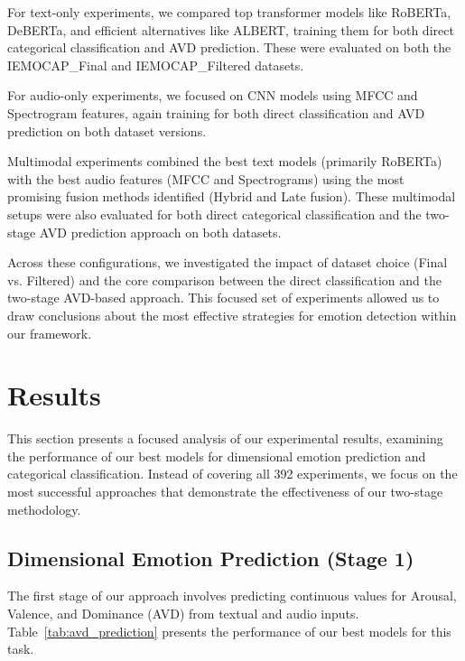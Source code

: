 \documentclass[12pt]{article}
\begin{document}
For text-only experiments, we compared top transformer models like RoBERTa, DeBERTa, and efficient alternatives like ALBERT, training them for both direct categorical classification and AVD prediction. These were evaluated on both the IEMOCAP\_Final and IEMOCAP\_Filtered datasets.

For audio-only experiments, we focused on CNN models using MFCC and Spectrogram features, again training for both direct classification and AVD prediction on both dataset versions.

Multimodal experiments combined the best text models (primarily RoBERTa) with the best audio features (MFCC and Spectrograms) using the most promising fusion methods identified (Hybrid and Late fusion). These multimodal setups were also evaluated for both direct categorical classification and the two-stage AVD prediction approach on both datasets.

Across these configurations, we investigated the impact of dataset choice (Final vs. Filtered) and the core comparison between the direct classification and the two-stage AVD-based approach. This focused set of experiments allowed us to draw conclusions about the most effective strategies for emotion detection within our framework.

\section{Results}
\label{sec:results}

This section presents a focused analysis of our experimental results, examining the performance of our best models for dimensional emotion prediction and categorical classification. Instead of covering all 392 experiments, we focus on the most successful approaches that demonstrate the effectiveness of our two-stage methodology.

\subsection{Dimensional Emotion Prediction (Stage 1)}

The first stage of our approach involves predicting continuous values for Arousal, Valence, and Dominance (AVD) from textual and audio inputs. Table~\ref{tab:avd_prediction} presents the performance of our best models for this task.
\end{document}

